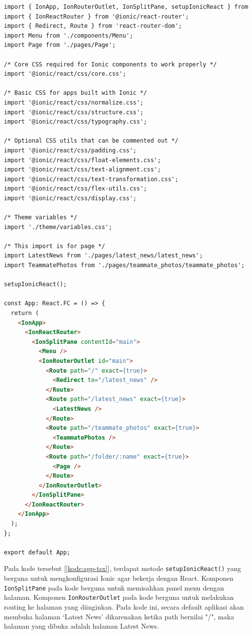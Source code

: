 \begin{lstlisting}[language=HTML, caption=Kode dari App.tsx, label=kode:app-tsx]
import { IonApp, IonRouterOutlet, IonSplitPane, setupIonicReact } from '@ionic/react';
import { IonReactRouter } from '@ionic/react-router';
import { Redirect, Route } from 'react-router-dom';
import Menu from './components/Menu';
import Page from './pages/Page';

/* Core CSS required for Ionic components to work properly */
import '@ionic/react/css/core.css';

/* Basic CSS for apps built with Ionic */
import '@ionic/react/css/normalize.css';
import '@ionic/react/css/structure.css';
import '@ionic/react/css/typography.css';

/* Optional CSS utils that can be commented out */
import '@ionic/react/css/padding.css';
import '@ionic/react/css/float-elements.css';
import '@ionic/react/css/text-alignment.css';
import '@ionic/react/css/text-transformation.css';
import '@ionic/react/css/flex-utils.css';
import '@ionic/react/css/display.css';

/* Theme variables */
import './theme/variables.css';

/* This import is for page */
import LatestNews from './pages/latest_news/latest_news';
import TeammatePhotos from './pages/teammate_photos/teammate_photos';

setupIonicReact();

const App: React.FC = () => {
  return (
    <IonApp>
      <IonReactRouter>
        <IonSplitPane contentId="main">
          <Menu />
          <IonRouterOutlet id="main">
            <Route path="/" exact={true}>
              <Redirect to="/latest_news" />
            </Route>
            <Route path="/latest_news" exact={true}>
              <LatestNews />
            </Route>
            <Route path="/teammate_photos" exact={true}>
              <TeammatePhotos />
            </Route>
            <Route path="/folder/:name" exact={true}>
              <Page />
            </Route>
          </IonRouterOutlet>
        </IonSplitPane>
      </IonReactRouter>
    </IonApp>
  );
};

export default App;

\end{lstlisting}

Pada kode tersebut [\ref{kode:app-tsx}], terdapat metode \texttt{setupIonicReact()} yang berguna untuk mengkonfigurasi Ionic agar bekerja dengan React. Komponen \texttt{IonSplitPane} pada kode berguna untuk memisahkan panel menu dengan halaman. Komponen \texttt{IonRouterOutlet} pada kode berguna untuk melakukan routing ke halaman yang diinginkan. Pada kode ini, secara default aplikasi akan membuka halaman `Latest News' dikarenakan ketika path bernilai "/", maka halaman yang dibuka adalah halaman Latest News.

